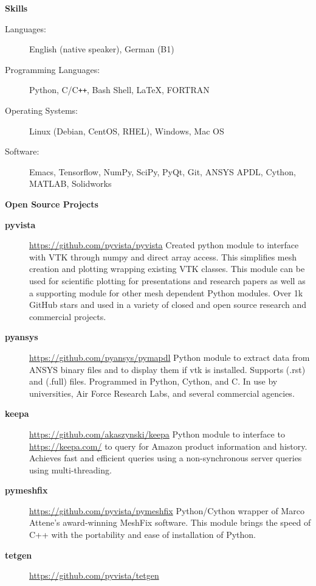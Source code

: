 \documentclass[letterpaper,11pt]{article}
\newcommand{\resheading}[1]{{\large \colorbox{mygrey}{\begin{minipage}{\textwidth}{\textbf{#1 \vphantom{p\^{E}}}}\end{minipage}}}}
\begin{document}
\resheading{Skills}

\begin{description}
\item [Languages:] English (native speaker), German (B1)
\item[Programming Languages:] Python, C/C{}\verb!++!, Bash Shell, \LaTeX, FORTRAN
\item[Operating Systems:] Linux (Debian, CentOS, RHEL), Windows, Mac OS
\item[Software:] Emacs, Tensorflow, NumPy, SciPy, PyQt, Git, ANSYS APDL, Cython, MATLAB, Solidworks
\end{description}

\resheading{Open Source Projects}

\begin{description}
\item[\textbf{pyvista}] \url{https://github.com/pyvista/pyvista} \newline
  Created python module to interface with VTK through numpy and direct array access. This simplifies mesh creation and plotting wrapping existing VTK classes.  This module can be used for scientific plotting for presentations and research papers as well as a supporting module for other mesh dependent Python modules.  Over 1k GitHub stars and used in a variety of closed and open source research and commercial projects.
\item[\textbf{pyansys}] \url{https://github.com/pyansys/pymapdl} \newline
  Python module to extract data from ANSYS binary files and to display them if vtk is installed.  Supports (.rst) and (.full) files.  Programmed in Python, Cython, and C.  In use by universities, Air Force Research Labs, and several commercial agencies.
\item[\textbf{keepa}] \url{https://github.com/akaszynski/keepa} \newline
Python module to interface to \url{https://keepa.com/} to query for Amazon product information and history.  Achieves fast and efficient queries using a non-synchronous server queries using multi-threading.
\item[\textbf{pymeshfix}] \url{https://github.com/pyvista/pymeshfix} \newline
Python/Cython wrapper of Marco Attene's award-winning MeshFix software. This module brings the speed of C++ with the portability and ease of installation of Python.
\item[\textbf{tetgen}] \url{https://github.com/pyvista/tetgen} \newline

\end{description}
\end{document}
